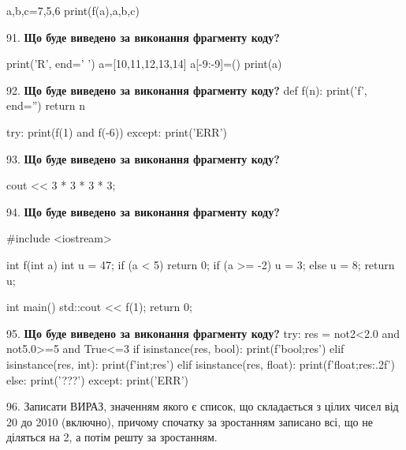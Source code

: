\documentclass[11pt]{article}
\begin{document}
a,b,c=7,5,6
print(f(a),a,b,c)
\par\vspace{5mm}

91. \textbf{Що буде виведено за виконання фрагменту коду?}

print('R', end=' ')
a=[10,11,12,13,14]
a[-9:-9]=()
print(a)

\par\vspace{5mm}

92. \textbf{Що буде виведено за виконання фрагменту коду?}
def f(n):
    print('f', end='')
    return n

try:
    print(f(1) and f(-6))
except:
    print('ERR')
\par\vspace{5mm}

93. \textbf{Що буде виведено за виконання фрагменту коду?}

cout << 3 * 3 * 3 * 3;
\par\vspace{5mm}

94. \textbf{Що буде виведено за виконання фрагменту коду?}

#include <iostream>

int f(int a){
    int u = 47;
    if (a < 5) 
        return 0;
    if (a >= -2)
         u = 3;
    else
         u = 8;
    return u;
}

int main(){
    std::cout << f(1);
    return 0;
}

\par\vspace{5mm}

95. \textbf{Що буде виведено за виконання фрагменту коду?}
try:
    res = not2<2.0 and not5.0>=5 and True<=3
    if isinstance(res, bool):
        print(f'bool;{res}')
    elif isinstance(res, int):
        print(f'int;{res}')
    elif isinstance(res, float):
        print(f'float;{res:.2f}')
    else:
        print('???')
except:
    print('ERR')
\par\vspace{5mm}

96. 
Записати ВИРАЗ, значенням якого є список, що складається з цілих чисел від 20 до 2010 (включно), причому спочатку за зростанням записано всі, що не діляться на 2, а потім решту за зростанням.\par\vspace{5mm}
\end{document}
